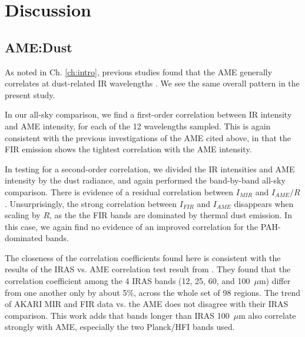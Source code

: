
    \section{Discussion}
      \subsection{AME:Dust}
        As noted in Ch. \hyperref[ch:intro]{\ref{ch:intro}}, previous studies found that the AME generally correlates at dust-related IR wavelengths \citep{ysard10b,planckXV, hensley16}. We see the same overall pattern in the present study.

         In our all-sky comparison, we find a first-order correlation between IR intensity and AME intensity, for each of the 12 wavelengths sampled. This is again consistent with the previous investigations of the AME cited above, in that the FIR emission shows the tightest correlation with the AME intensity.

         In testing for a second-order correlation, we divided the IR intensities and AME intensity by the dust radiance, and again performed the band-by-band all-sky comparison. There is evidence of a residual correlation between $I_{MIR}$ and $I_{AME}/R$. Unsurprisingly, the strong correlation between $I_{FIR}$ and $I_{AME}$ disappears when scaling by $R$, as the the FIR bands are dominated by thermal dust emission. In this case, we again find no evidence of an improved correlation for the PAH-dominated bands.

           The closeness of the correlation coefficients found here is consistent with the results of the IRAS vs. AME correlation test result from \cite{planckXV}. They found that the correlation coefficient among the 4 IRAS bands (12, 25, 60, and 100~$\mu$m) differ from one another only by about 5\%, across the whole set of 98 regions. The trend of AKARI MIR and FIR data vs. the AME does not disagree with their IRAS comparison. This work adds that bands longer than IRAS 100~$\mu$m also correlate strongly with AME, especially the two Planck/HFI bands used.

